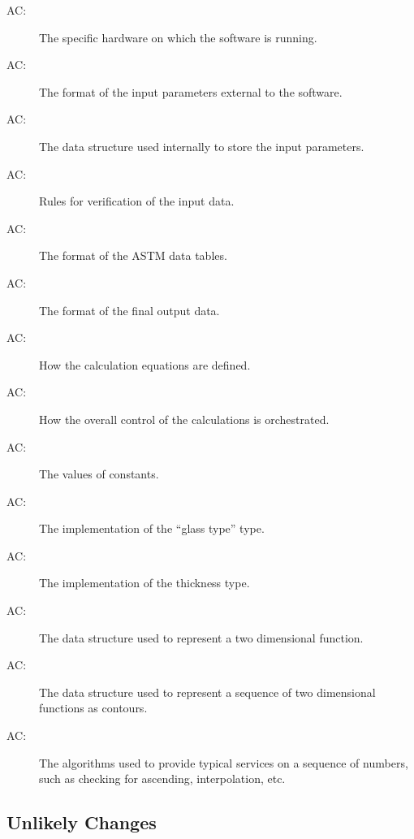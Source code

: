 \documentclass[12pt]{article}
\newcounter{acnum}
\newcommand{\actheacnum}{AC\theacnum}
\begin{document}
\begin{description}

\item[ \actheacnum \label{acHardware}:] The specific
  hardware on which the software is running.
\item[ \actheacnum \label{acInputFormat}:] The format of the
  input parameters external to the software.
\item[ \actheacnum \label{acParamsStruct}:] The data structure
  used internally to store the input parameters.
\item[ \actheacnum \label{acVerific}:] Rules for
  verification of the input data.
\item[ \actheacnum \label{acInASTMFormat}:] The format of the
  ASTM data tables.
\item[ \actheacnum \label{acOutput}:] The format of the
  final output data.
\item[ \actheacnum \label{acCalc}:] How the calculation
  equations are defined.
\item[ \actheacnum \label{acControl}:] How the overall
  control of the calculations is orchestrated.
\item[ \actheacnum \label{acConstants}:] The values of
  constants.
\item[ \actheacnum \label{acGlassType}:] The
  implementation of the ``glass type'' type.
\item[ \actheacnum \label{acThickness}:] The
  implementation of the thickness type.
\item[ \actheacnum \label{acFuncts}:] The data structure
  used to represent a two dimensional function.
\item[ \actheacnum \label{acContours}:] The data structure used
  to represent a sequence of two dimensional functions as contours.
\item[ \actheacnum \label{acSeqServices}:] The algorithms
  used to provide typical services on a sequence of numbers, such as checking
  for ascending, interpolation, etc.

\end{description}

\subsection{Unlikely Changes} \label{SecUchange}
\end{document}
